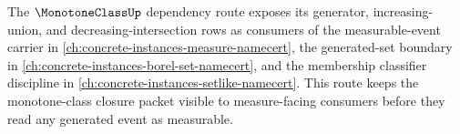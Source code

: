 The $\MonotoneClassUp$ dependency route exposes its generator, increasing-union, and decreasing-intersection rows as consumers of the measurable-event carrier in \autoref{ch:concrete-instances-measure-namecert}, the generated-set boundary in \autoref{ch:concrete-instances-borel-set-namecert}, and the membership classifier discipline in \autoref{ch:concrete-instances-setlike-namecert}. This route keeps the monotone-class closure packet visible to measure-facing consumers before they read any generated event as measurable.
